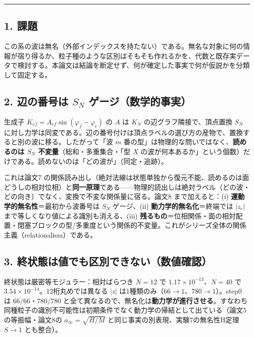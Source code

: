 \documentclass[
  a4paper,
]{ltjsarticle}
\begin{document}
\begin{center}\rule{0.5\linewidth}{0.5pt}\end{center}

\subsection{1. 課題}\label{ux8ab2ux984c}

この系の波は無名（外部インデックスを持たない）である。無名な対象に何の情報が宿り得るか、粒子種のような区別はそもそも作れるかを、代数と既存実データで検討する。本論文は結論を断定せず、何が確定した事実で何が仮説かを分類して固定する。

\subsection{\texorpdfstring{2. 辺の番号は \(S_N\)
ゲージ（数学的事実）}{2. 辺の番号は S\_N ゲージ（数学的事実）}}\label{ux8fbaux306eux756aux53f7ux306f-s_n-ux30b2ux30fcux30b8ux6570ux5b66ux7684ux4e8bux5b9f}

生成子 \(K_{ef}=A_{ef}\sin(\varphi_f-\varphi_e)\) の \(A\) は \(K_N\)
の辺グラフ隣接で、頂点置換 \(S_N\)
に対し力学は同変である。辺の番号付けは頂点ラベルの選び方の産物で、置換すると別の波に移る。したがって「波
\(m\) 番の型」は物理的な問いではなく、\textbf{読めるのは \(S_N\)
不変量}（総和・多重集合・「型 \(X\)
の波が何本あるか」という個数）だけである。読めないのは「どの波が」（同定・追跡）。

これは論文7
の関係読み出し（絶対法線は状態単独から復元不能、読めるのは面どうしの相対位相）と\textbf{同一原理}である------物理的読出しは絶対ラベル（どの波・どの向き）でなく、変換で不変な関係量に宿る。論文8
まで加えると：(i) \textbf{運動学的無名性}＝最初から波番号は \(S_N\)
ゲージ、(ii) \textbf{動力学的無名化}＝終端では \(|z_e|\)
まで等しくなり値による識別も消える、(iii)
\textbf{残るもの}＝位相関係・面の相対配置・閉塞ブロックの型/多重度という関係的不変量。これがシリーズ全体の関係主義（relationalism）である。

\subsection{3.
終状態は値でも区別できない（数値確認）}\label{ux7d42ux72b6ux614bux306fux5024ux3067ux3082ux533aux5225ux3067ux304dux306aux3044ux6570ux5024ux78baux8a8d}

終状態は厳密等モジュラー：相対ばらつき \(N=12\) で
\(1.17\times10^{-13}\)、\(N=40\) で
\(3.54\times10^{-14}\)。12桁丸めでは異なる \(|z|\)
は1種類のみ（\(66\to1\)、\(780\to1\)）。step0 は \(66/66\)・\(780/780\)
と全て異なるので、無名化は\textbf{動力学が進行させる}。すなわち同種粒子の識別不可能性は初期条件でなく動力学の帰結として出ている（論文5の等振幅・論文8の
\(a_\infty=\sqrt{H/M}\) と同じ事実の別表現、実験7の無名性H定理 \(S\to1\)
とも整合）。
\end{document}
